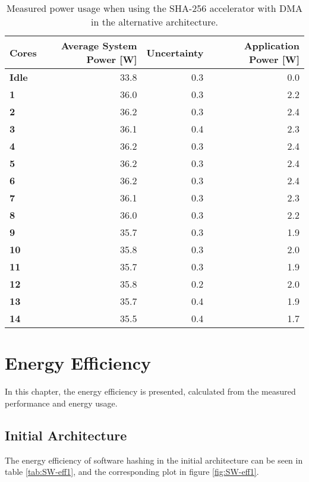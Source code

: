 \begin{appendix}
\begin{table}
\centering
\begin{tabular}{| l | r | r || r |}
  \hline 
  \textbf{Cores} & \textbf{Average System Power [W]} & \textbf{Uncertainty} & \textbf{Application Power [W]} \\
  \hline                       
  \textbf{Idle} &  33.8 & 0.3 & 0.0\\
  \textbf{1} &  36.0 & 0.3 & 2.2\\
  \textbf{2} &  36.2 & 0.3 & 2.4\\
  \textbf{3} &  36.1 & 0.4 & 2.3\\
  \textbf{4} &  36.2 & 0.3 & 2.4\\
  \textbf{5} &  36.2 & 0.3 & 2.4\\
  \textbf{6} &  36.2 & 0.3 & 2.4\\
  \textbf{7} &  36.1 & 0.3 & 2.3\\
  \textbf{8} &  36.0 & 0.3 & 2.2\\
  \textbf{9} &  35.7 & 0.3 & 1.9\\
  \textbf{10} &  35.8 & 0.3 & 2.0\\
  \textbf{11} &  35.7 & 0.3 & 1.9\\
  \textbf{12} &  35.8 & 0.2 & 2.0\\
  \textbf{13} &  35.7 & 0.4 & 1.9\\
  \textbf{14} &  35.5 & 0.4 & 1.7\\
  \hline 
\end{tabular}
\caption{Measured power usage when using the SHA-256 accelerator with DMA in the alternative architecture.}
\label{tab:SHADMA-power2}
\end{table}

\section{Energy Efficiency}

In this chapter, the energy efficiency is presented, calculated from the measured performance and energy usage.

\subsection{Initial Architecture}

The energy efficiency of software hashing in the initial architecture can be seen in table \ref{tab:SW-eff1}, and the corresponding plot in figure \ref{fig:SW-eff1}.


\end{appendix}
